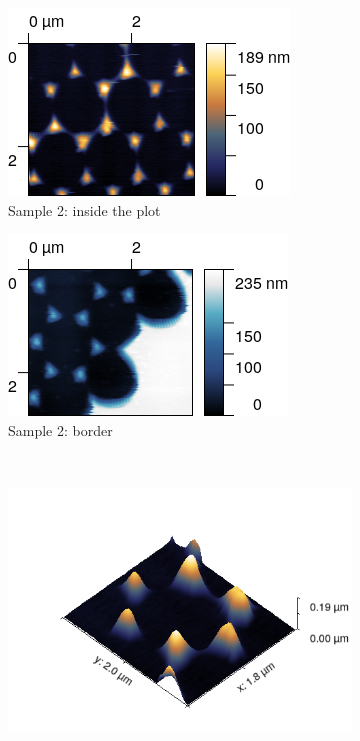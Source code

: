 \documentclass[11pt,a4paper]{article}
\begin{document}
\begin{figure}[H]
\centering
\begin{subfigure}[b]{0.45\textwidth}
\includegraphics[width=\textwidth]{sm_sample2}
\caption{Sample 2: inside the plot}
\label{fig:sample2}
\end{subfigure}
\begin{subfigure}[b]{0.45\textwidth}
\includegraphics[width=\textwidth]{sm_sample2_border}
\caption{Sample 2: border}
\label{fig:}
\end{subfigure}\\\vspace{.2cm}
\begin{subfigure}[b]{0.45\textwidth}
\includegraphics[width=\textwidth]{sm_sample2_3D}

\end{subfigure}
\end{figure}
\end{document}
